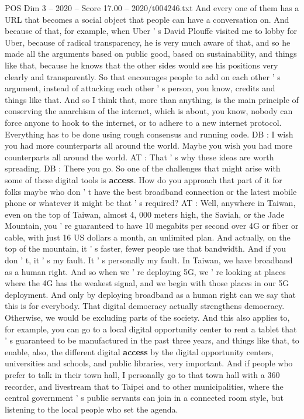 \begin{textsample}{POS Dim 3 – 2020 – Score 17.00 – 2020/t004246.txt}
And every one of them has a URL that becomes a social object that people can have a conversation on.
And because of that, for example, when Uber ' s David Plouffe visited me to lobby for Uber, because of radical transparency, he is very much aware of that, and so he made all the arguments based on public good, based on sustainability, and things like that, because he knows that the other sides would see his positions very clearly and transparently.
So that encourages people to add on each other ' s argument, instead of attacking each other ' s person, you know, credits and things like that.
And so I think that, more than anything, is the main principle of conserving the anarchism of the internet, which is about, you know, nobody can force anyone to hook to the internet, or to adhere to a new internet protocol.
Everything has to be done using rough consensus and running code.
DB : I wish you had more counterparts all around the world.
Maybe you wish you had more counterparts all around the world.
AT : That ' s why these ideas are worth spreading.
DB : There you go.
So one of the challenges that might arise with some of these digital tools is \textbf{access}.
How do you approach that part of it for folks maybe who don ' t have the best broadband connection or the latest mobile phone or whatever it might be that ' s required?
AT : Well, anywhere in Taiwan, even on the top of Taiwan, almost 4, 000 meters high, the Saviah, or the Jade Mountain, you ' re guaranteed to have 10 megabits per second over 4G or fiber or cable, with just 16 US dollars a month, an unlimited plan.
And actually, on the top of the mountain, it ' s faster, fewer people use that bandwidth.
And if you don ' t, it ' s my fault.
It ' s personally my fault.
In Taiwan, we have broadband as a human right.
And so when we ' re deploying 5G, we ' re looking at places where the 4G has the weakest signal, and we begin with those places in our 5G deployment.
And only by deploying broadband as a human right can we say that this is for everybody.
That digital democracy actually strengthens democracy.
Otherwise, we would be excluding parts of the society.
And this also applies to, for example, you can go to a local digital opportunity center to rent a tablet that ' s guaranteed to be manufactured in the past three years, and things like that, to enable, also, the different digital \textbf{access} by the digital opportunity centers, universities and schools, and public libraries, very important.
And if people who prefer to talk in their town hall, I personally go to that town hall with a 360 recorder, and livestream that to Taipei and to other municipalities, where the central government ' s public servants can join in a connected room style, but listening to the local people who set the agenda.

\end{textsample}
